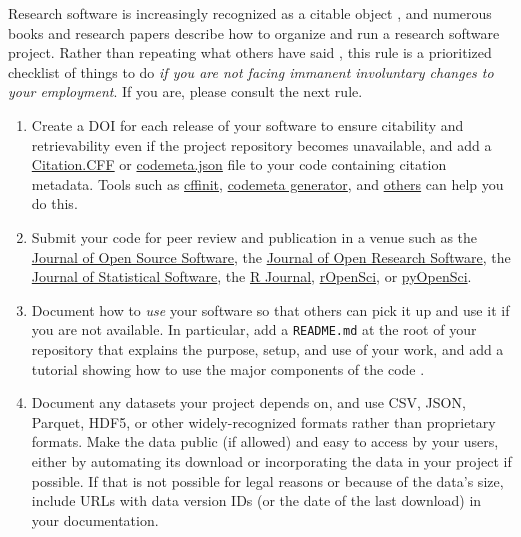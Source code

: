 \documentclass[10pt,letterpaper]{article}
\begin{document}
Research software is increasingly recognized as a citable object \cite{Smith2016,Katz2021,Garijo2024},
and numerous books and research papers describe how to organize and run a research software project.
Rather than repeating what others have said
\cite{Sandve2013,Wilson2014},
this rule is a prioritized checklist of things to do
\emph{if you are not facing immanent involuntary changes to your employment}.
If you are,
please consult the next rule.

\begin{enumerate}

\item
  Create a DOI for each release of your software
  to ensure citability and retrievability even if the project repository becomes unavailable,
  and add a \href{https://citation-file-format.github.io/}{Citation.CFF}
  or \href{https://codemeta.github.io}{codemeta.json} file to your code \cite{Druskat2021}
  containing citation metadata.
  Tools such as \href{https://citation-file-format.github.io/cff-initializer-javascript/}{cffinit},
  \href{https://codemeta.github.io/codemeta-generator/}{codemeta generator},
  and \href{https://github.com/citation-file-format/citation-file-format/blob/main/README.md\#tools-to-work-with-citationcff-files-wrench}{others}
  can help you do this.

\item
  Submit your code for peer review and publication in a venue such as
  the \href{https://joss.theoj.org/}{Journal of Open Source Software},
  the \href{https://openresearchsoftware.metajnl.com/}{Journal of Open Research Software},
  the \href{http://www.jstatsoft.org}{Journal of Statistical Software},
  the \href{https://journal.r-project.org/}{R Journal},
  \href{https://ropensci.org/}{rOpenSci},
  or \href{https://www.pyopensci.org}{pyOpenSci}.

\item
  Document how to \emph{use} your software so that others can pick it up and use it if you are not available.
  In particular,
  add a \texttt{README.md} at the root of your repository
  that explains the purpose, setup, and use of your work,
  and add a tutorial showing how to use the major components of the code
  \cite{Lee2018b,Huybrechts2024,Littauer2025,Katz2025,Turing2025}.

\item
  Document any datasets your project depends on,
  and use CSV, JSON, Parquet, HDF5, or other widely-recognized formats rather than proprietary formats.
  Make the data public (if allowed) and easy to access by your users, either by automating its download or
  incorporating the data in your project if possible.
  If that is not possible for legal reasons or because of the data's size,
  include URLs with data version IDs (or the date of the last download) in your documentation.


\end{enumerate}
\end{document}
